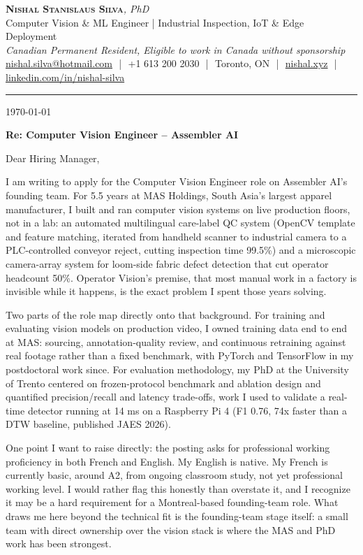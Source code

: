 \documentclass[11pt]{article}
\makeatletter
\newcommand{\clName}{Nishal Stanislaus Silva}
\newcommand{\clEmail}{nishal.silva@hotmail.com}
\newcommand{\clPhone}{+1 613 200 2030}
\newcommand{\clCity}{Toronto, ON}
\newcommand{\clSite}{https://nishal.xyz}
\newcommand{\clLinkedIn}{https://www.linkedin.com/in/nishal-silva}
\newcommand{\clStatus}{Canadian Permanent Resident, Eligible to work in Canada without sponsorship}
\newcommand{\clTagline}{Computer Vision \& ML Engineer | Industrial Inspection, IoT \& Edge Deployment}
\newcommand{\clRole}{Computer Vision Engineer}
\newcommand{\clCompany}{Assembler AI}
\makeatother
\begin{document}
\pagestyle{empty}

\begin{center}
    {\LARGE \scshape \textbf{\clName}}{\large \textit{, PhD}}
    \\[1pt]
    {\small \clTagline}
    \\[1pt]
    {\footnotesize\textit{\clStatus}}
    \\[1pt]
    {\small
    \href{mailto:\clEmail}{\clEmail}
    \,\,|\,\, \clPhone
    \,\,|\,\, \clCity
    \,\,|\,\, \href{\clSite}{nishal.xyz}
    \,\,|\,\, \href{\clLinkedIn}{linkedin.com/in/nishal-silva}}
\end{center}

\rule{\linewidth}{0.4pt}\vspace{0.6em}

\today

\textbf{Re: \clRole{} -- \clCompany{}}

Dear Hiring Manager,

I am writing to apply for the Computer Vision Engineer role on Assembler AI's founding team. For 5.5 years at MAS Holdings, South Asia's largest apparel manufacturer, I built and ran computer vision systems on live production floors, not in a lab: an automated multilingual care-label QC system (OpenCV template and feature matching, iterated from handheld scanner to industrial camera to a PLC-controlled conveyor reject, cutting inspection time 99.5\%) and a microscopic camera-array system for loom-side fabric defect detection that cut operator headcount 50\%. Operator Vision's premise, that most manual work in a factory is invisible while it happens, is the exact problem I spent those years solving.

Two parts of the role map directly onto that background. For training and evaluating vision models on production video, I owned training data end to end at MAS: sourcing, annotation-quality review, and continuous retraining against real footage rather than a fixed benchmark, with PyTorch and TensorFlow in my postdoctoral work since. For evaluation methodology, my PhD at the University of Trento centered on frozen-protocol benchmark and ablation design and quantified precision/recall and latency trade-offs, work I used to validate a real-time detector running at 14 ms on a Raspberry Pi 4 (F1 0.76, 74x faster than a DTW baseline, published JAES 2026).

One point I want to raise directly: the posting asks for professional working proficiency in both French and English. My English is native. My French is currently basic, around A2, from ongoing classroom study, not yet professional working level. I would rather flag this honestly than overstate it, and I recognize it may be a hard requirement for a Montreal-based founding-team role. What draws me here beyond the technical fit is the founding-team stage itself: a small team with direct ownership over the vision stack is where the MAS and PhD work has been strongest.
\end{document}
